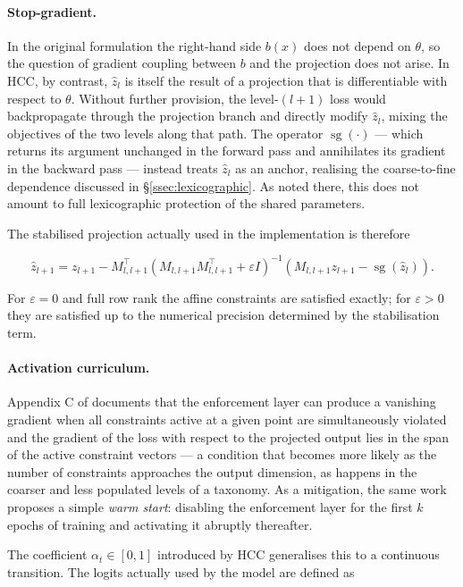 \paragraph{Stop-gradient.} In the original formulation the right-hand side $b(x)$ does not depend on $\theta$, so the question of gradient coupling between $b$ and the projection does not arise. In HCC, by contrast, $\hat z_l$ is itself the result of a projection that is differentiable with respect to $\theta$. Without further provision, the level-$(l+1)$ loss would backpropagate through the projection branch and directly modify $\hat z_l$, mixing the objectives of the two levels along that path. The operator $\operatorname{sg}(\cdot)$ --- which returns its argument unchanged in the forward pass and annihilates its gradient in the backward pass --- instead treats $\hat z_l$ as an anchor, realising the coarse-to-fine dependence discussed in \S\ref{ssec:lexicographic}. As noted there, this does not amount to full lexicographic protection of the shared parameters.

The stabilised projection actually used in the implementation is therefore

\[
\hat z_{l+1}
=
z_{l+1}
-
M_{l,l+1}^{\top}
\left(
M_{l,l+1}M_{l,l+1}^{\top}
+
\varepsilon I
\right)^{-1}
\left(
M_{l,l+1}z_{l+1}-\operatorname{sg}(\hat z_l)
\right).
\]

For $\varepsilon=0$ and full row rank the affine constraints are satisfied exactly; for $\varepsilon>0$ they are satisfied up to the numerical precision determined by the stabilisation term.

\paragraph{Activation curriculum.} Appendix C of \cite{min2024hardnet} documents that the enforcement layer can produce a vanishing gradient when all constraints active at a given point are simultaneously violated and the gradient of the loss with respect to the projected output lies in the span of the active constraint vectors --- a condition that becomes more likely as the number of constraints approaches the output dimension, as happens in the coarser and less populated levels of a taxonomy. As a mitigation, the same work proposes a simple \emph{warm start}: disabling the enforcement layer for the first $k$ epochs of training and activating it abruptly thereafter.

The coefficient $\alpha_t\in[0,1]$ introduced by HCC generalises this to a continuous transition. The logits actually used by the model are defined as


